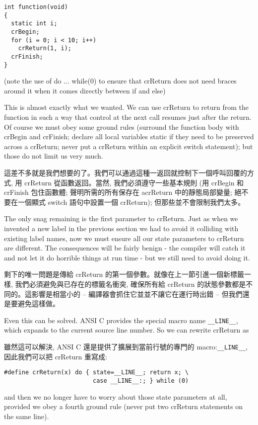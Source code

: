 \documentclass[12pt]{article}
\begin{document}
\begin{CJK}{UTF8}{bsmi}
\begin{lstlisting}[basicstyle=\footnotesize, breaklines=true]
int function(void) 
{
  static int i;
  crBegin;
  for (i = 0; i < 10; i++)
    crReturn(1, i);
  crFinish;
}
\end{lstlisting}

(note the use of do ... while(0) to ensure that crReturn does not need braces around it when it comes directly between if and else)

This is almost exactly what we wanted. We can use crReturn to return from the function in such a way that control at the next call resumes just after the return. Of course we must obey some ground rules (surround the function body with crBegin and crFinish; declare all local variables static if they need to be preserved across a crReturn; never put a crReturn within an explicit switch statement); but those do not limit us very much.

這差不多就是我們想要的了。我們可以通過這種一返回就控制下一個呼叫回覆的方式, 用 crReturn
從函數返回。當然, 我們必須遵守一些基本規則 (用 crBegin 和 crFinish 包住函數體; 聲明所需的所有保存在
acrReturn 中的靜態局部變量; 絕不要在一個顯式 switch 語句中設置一個 crReturn); 但那些並不會限制我們太多。

The only snag remaining is the first parameter to crReturn. Just as when we invented a new label in the previous section we had to avoid it colliding with existing label names, now we must ensure all our state parameters to crReturn are different. The consequences will be fairly benign - the compiler will catch it and not let it do horrible things at run time - but we still need to avoid doing it.

剩下的唯一問題是傳給 crReturn 的第一個參數。就像在上一節引進一個新標籤一樣, 我們必須避免與已存在的標籤名衝突, 確保所有給 crReturn 的狀態參數都是不同的。這影響是相當小的 -- 編譯器會抓住它並並不讓它在運行時出錯 -- 但我們還是要避免這樣做。

Even this can be solved. ANSI C provides the special macro name \verb+__LINE__+, which expands to the current source line number. So we can rewrite crReturn as

雖然這可以解決, ANSI C 還是提供了擴展到當前行號的專門的 macro:\verb+__LINE__+, 因此我們可以把 crReturn 重寫成:

\begin{lstlisting}[basicstyle=\footnotesize, breaklines=true]
#define crReturn(x) do { state=__LINE__; return x; \
                         case __LINE__:; } while (0)
\end{lstlisting}

and then we no longer have to worry about those state parameters at all, provided we obey a fourth ground rule (never put two crReturn statements on the same line).


\end{CJK}
\end{document}
